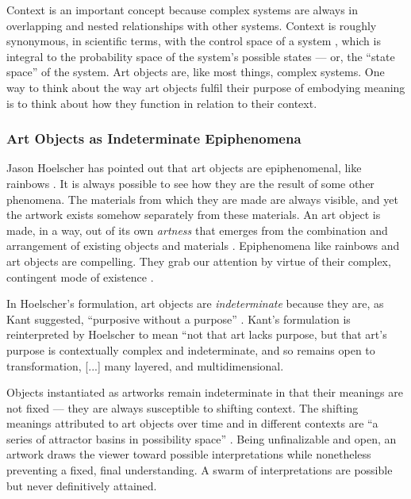 \documentclass[letterpaper]{article}
\begin{document}
    Context is an important concept because complex systems are always in overlapping and nested relationships with other systems. Context is roughly synonymous, in scientific terms, with the control space of a system \citep[p.130]{DeLandaAssmblgThry2016}, which is integral to the probability space of the system's possible states — or, the “state space” of the system. Art objects are, like most things, complex systems. One way to think about the way art objects fulfil their purpose of embodying meaning is to think about how they function in relation to their context.
    
    \subsubsection{Art Objects as Indeterminate Epiphenomena}

    Jason Hoelscher has pointed out that art objects are epiphenomenal, like rainbows \citep[p.17]{HoelscherArtAsInfrmtn2021}. It is always possible to see how they are the result of some other phenomena. The materials from which they are made are always visible, and yet the artwork exists somehow separately from these materials. An art object is made, in a way, out of its own \emph{artness} that emerges from the combination and arrangement of existing objects and materials \citep[p.2]{HoelscherThPtcsOfPhsSpc2014}. Epiphenomena like rainbows and art objects are compelling. They grab our attention by virtue of their complex, contingent mode of existence \citep[p.18]{HoelscherThPtcsOfPhsSpc2014}. 
    
    In Hoelscher's formulation, art objects are \emph{indeterminate} because they are, as Kant suggested, “purposive without a purpose” \citep[p.57]{KantCrtqOfJdgmnt}. Kant's formulation is reinterpreted by Hoelscher to mean “not that art lacks purpose, but that art's purpose is contextually complex and indeterminate, and so remains open to transformation, [...] many layered, and multidimensional.\citep[p.25]{HoelscherThPtcsOfPhsSpc2014}

    Objects instantiated as artworks remain indeterminate in that their meanings are not fixed — they are always susceptible to shifting context. The shifting meanings attributed to art objects over time and in different contexts are “a series of attractor basins in possibility space” \citep[p.4]{HoelscherThPtcsOfPhsSpc2014}. Being unfinalizable and open, an artwork draws the viewer toward possible interpretations while nonetheless preventing a fixed, final understanding. A swarm of interpretations are possible but never definitively attained. \citep[p.12]{HoelscherThPtcsOfPhsSpc2014}
\end{document}
